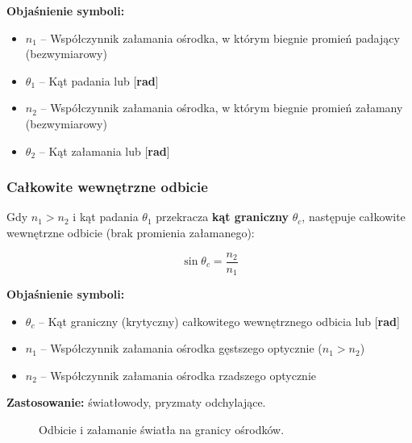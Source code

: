 \documentclass[12pt,a4paper]{article}
\newcommand{\oznaczenie}[2]{%
  \item $#1$ -- #2%
}
\begin{document}
\begin{objasnbox}
\textbf{Objaśnienie symboli:}
\begin{itemize}[leftmargin=2em]
  \oznaczenie{n_1}{Współczynnik załamania ośrodka, w którym biegnie promień padający
                   (bezwymiarowy)}
  \oznaczenie{\theta_1}{Kąt padania \quad [°] lub [\textbf{rad}]}
  \oznaczenie{n_2}{Współczynnik załamania ośrodka, w którym biegnie promień załamany
                   (bezwymiarowy)}
  \oznaczenie{\theta_2}{Kąt załamania \quad [°] lub [\textbf{rad}]}
\end{itemize}
\end{objasnbox}

\subsubsection{Całkowite wewnętrzne odbicie}

Gdy $n_1 > n_2$ i kąt padania $\theta_1$ przekracza \textbf{kąt graniczny} $\theta_c$,
następuje całkowite wewnętrzne odbicie (brak promienia załamanego):

\begin{wzorbox}
\begin{equation}
  \sin\theta_c = \frac{n_2}{n_1}
  \label{eq:kat_graniczny}
\end{equation}
\end{wzorbox}

\begin{objasnbox}
\textbf{Objaśnienie symboli:}
\begin{itemize}[leftmargin=2em]
  \oznaczenie{\theta_c}{Kąt graniczny (krytyczny) całkowitego wewnętrznego odbicia
                        \quad [°] lub [\textbf{rad}]}
  \oznaczenie{n_1}{Współczynnik załamania ośrodka gęstszego optycznie ($n_1>n_2$)}
  \oznaczenie{n_2}{Współczynnik załamania ośrodka rzadszego optycznie}
\end{itemize}
\textbf{Zastosowanie:} światłowody, pryzmaty odchylające.
\end{objasnbox}

\begin{figure}[H]
\centering
{}
\caption{Odbicie i załamanie światła na granicy ośrodków.}
\end{figure}
\end{document}
